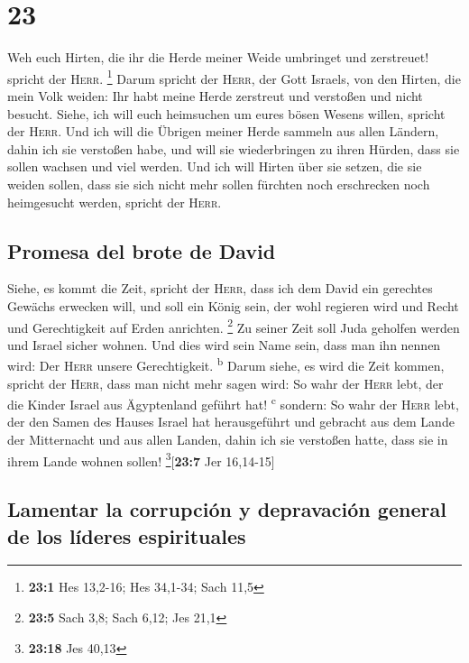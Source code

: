 \hypertarget{section-22}{%
\section{23}\label{section-22}}

 Weh euch Hirten, die ihr die Herde meiner Weide umbringet
und zerstreuet! spricht der \textsc{Herr}. \footnote{\textbf{23:1} Hes
  13,2-16; Hes 34,1-34; Sach 11,5}  Darum spricht der
\textsc{Herr}, der Gott Israels, von den Hirten, die mein Volk weiden:
Ihr habt meine Herde zerstreut und verstoßen und nicht besucht. Siehe,
ich will euch heimsuchen um eures bösen Wesens willen, spricht der
\textsc{Herr}.  Und ich will die Übrigen meiner Herde
sammeln aus allen Ländern, dahin ich sie verstoßen habe, und will sie
wiederbringen zu ihren Hürden, dass sie sollen wachsen und viel werden.
 Und ich will Hirten über sie setzen, die sie weiden
sollen, dass sie sich nicht mehr sollen fürchten noch erschrecken noch
heimgesucht werden, spricht der \textsc{Herr}.

\hypertarget{promesa-del-brote-de-david}{%
\subsection{Promesa del brote de
David}\label{promesa-del-brote-de-david}}

 Siehe, es kommt die Zeit, spricht der \textsc{Herr}, dass
ich dem David ein gerechtes Gewächs erwecken will, und soll ein König
sein, der wohl regieren wird und Recht und Gerechtigkeit auf Erden
anrichten. \footnote{\textbf{23:5} Sach 3,8; Sach 6,12; Jes 21,1}
 Zu seiner Zeit soll Juda geholfen werden und Israel
sicher wohnen. Und dies wird sein Name sein, dass man ihn nennen wird:
Der \textsc{Herr} unsere Gerechtigkeit. \textsuperscript{b}
 Darum siehe, es wird die Zeit kommen, spricht der
\textsc{Herr}, dass man nicht mehr sagen wird: So wahr der \textsc{Herr}
lebt, der die Kinder Israel aus Ägyptenland geführt hat!
\textsuperscript{c}  sondern: So wahr der \textsc{Herr}
lebt, der den Samen des Hauses Israel hat herausgeführt und gebracht aus
dem Lande der Mitternacht und aus allen Landen, dahin ich sie verstoßen
hatte, dass sie in ihrem Lande wohnen sollen!
\footnote{\textbf{23:18} Jes 40,13}{[}\textbf{23:7} Jer 16,14-15{]}

\hypertarget{lamentar-la-corrupciuxf3n-y-depravaciuxf3n-general-de-los-luxedderes-espirituales}{%
\subsection{Lamentar la corrupción y depravación general de los líderes
espirituales}\label{lamentar-la-corrupciuxf3n-y-depravaciuxf3n-general-de-los-luxedderes-espirituales}}

